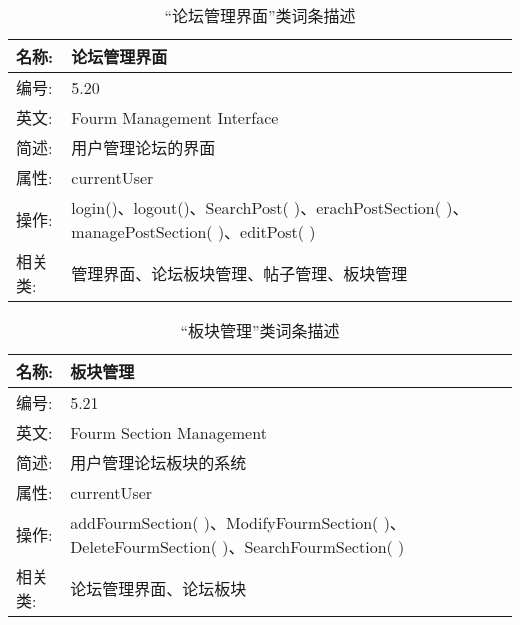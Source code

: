 \begin{table}[H]  
\caption{“论坛管理界面”类词条描述}  
\begin{center}  
    \begin{tabular}{l p{11cm}} 
        \hline
        \quad 名称:  & 论坛管理界面 \\
        \hline
        \quad 编号:  & 5.20 \\
        \hline
        \quad 英文:  &  Fourm Management Interface \\
        \hline
        \quad 简述:  & 用户管理论坛的界面 \\
        \hline
        \quad 属性:  & currentUser \\
        \hline
        \quad 操作:  & login()、logout()、SearchPost( )、erachPostSection( )、managePostSection( )、editPost( )\\
        \hline
        \quad 相关类: & 管理界面、论坛板块管理、帖子管理、板块管理\\
        \hline
    \end{tabular}
\end{center}
\end{table}

\begin{table}[H]  
\caption{“板块管理”类词条描述}  
\begin{center}  
    \begin{tabular}{l p{11cm}} 
        \hline
        \quad 名称:  & 板块管理 \\
        \hline
        \quad 编号:  & 5.21 \\
        \hline
        \quad 英文:  &  Fourm Section Management\\
        \hline
        \quad 简述:  & 用户管理论坛板块的系统 \\
        \hline
        \quad 属性:  & currentUser \\
        \hline
        \quad 操作:  & addFourmSection( )、ModifyFourmSection( )、DeleteFourmSection( )、SearchFourmSection( )\\
        \hline
        \quad 相关类: & 论坛管理界面、论坛板块\\
        \hline
    \end{tabular}
\end{center}
\end{table}

